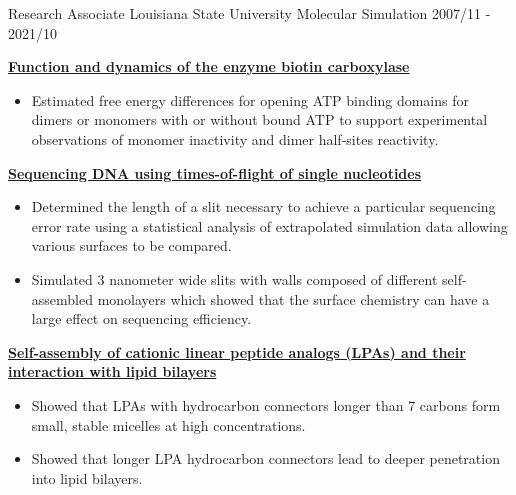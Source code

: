 \pagebreak


\begin{cventries}
  \cventry
    {Research Associate} %
    {Louisiana State University} %
    {Molecular Simulation} %
    {2007/11 - 2021/10} %
    {
        \begin{cvitems} %
            \item {\textbf{\underline{Function and dynamics of the enzyme biotin carboxylase}}}
                \vspace{2pt}
                \begin{itemize}
                \item {Estimated free energy differences for opening ATP binding domains for dimers or monomers with or without bound ATP to support experimental observations of monomer inactivity and dimer half-sites reactivity.}
                \end{itemize}
            \item {\textbf{\underline{Sequencing DNA using times-of-flight of single nucleotides}}}
                \vspace{2pt}
                \begin{itemize}
                    \item {Determined the length of a slit necessary to achieve a particular sequencing error rate using a statistical analysis of extrapolated simulation data allowing various surfaces to be compared.}
                    \item {Simulated 3 nanometer wide slits with walls composed of different self-assembled monolayers which showed that the surface chemistry can have a large effect on sequencing efficiency.}
                \end{itemize}        
            \item {\textbf{\underline{Self-assembly of cationic linear peptide analogs (LPAs) and their interaction with lipid bilayers}}}
                \vspace{2pt}
                \begin{itemize}
                \item {Showed that LPAs with hydrocarbon connectors longer than 7 carbons form small, stable micelles at high concentrations.}
                \item {Showed that longer LPA hydrocarbon connectors lead to deeper penetration into lipid bilayers.}

\end{itemize}
\end{cvitems}}
\end{cventries}
